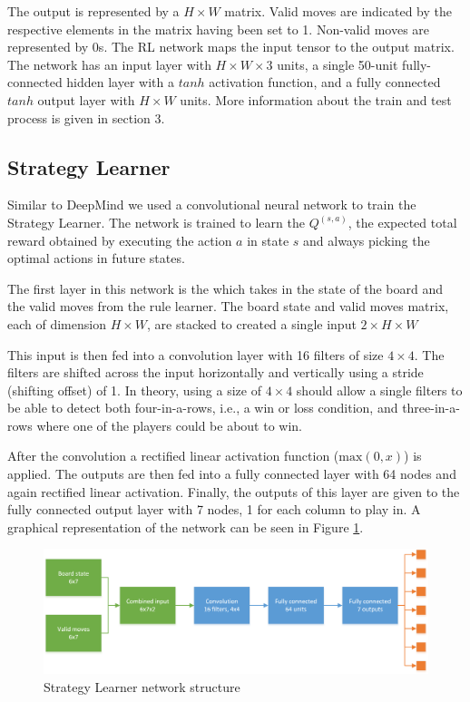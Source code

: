 The output is represented by a $H \times W$ matrix. Valid moves are indicated by the respective elements in the matrix having been set to 1. Non-valid moves are represented by 0s.
The RL network maps the input tensor to the output matrix. The network has an input layer with $H \times W \times 3$ units, a single 50-unit fully-connected hidden layer with a $tanh$ activation function, and a fully connected $tanh$ output layer with $H \times W$ units. More information about the train and test process is given in section 3.

\subsection{Strategy Learner}
Similar to DeepMind we used a convolutional neural network to train the Strategy Learner. The network is trained to learn the $Q^(s, a)$, the expected total reward obtained by executing the action $a$ in state $s$ and always picking the optimal actions in future states.

The first layer in this network is the which takes in the state of the board and the valid moves from the rule learner. The board state and valid moves matrix, each of dimension $H \times W$, are stacked to created a single input $2 \times H \times W$

This input is then fed into a convolution layer with 16 filters of size $4 \times 4$. The filters are shifted across the input horizontally and vertically using a stride (shifting offset) of 1. In theory, using a size of $4 \times 4$ should allow a single filters to be able to detect both four-in-a-rows, i.e., a win or loss condition, and three-in-a-rows where one of the players could be about to win.

After the convolution a rectified linear activation function ($\text{max}(0, x)$) is applied. The outputs are then fed into a fully connected layer with 64 nodes and again rectified linear activation. Finally, the outputs of this layer are given to the fully connected output layer with 7 nodes, 1 for each column to play in. A graphical representation of the network can be seen in Figure \ref{fig:strat_learn}.

\begin{figure}
  \includegraphics[width=\linewidth]{Network1.png}
  \caption{Strategy Learner network structure}
  \label{fig:strat_learn}
\end{figure}

